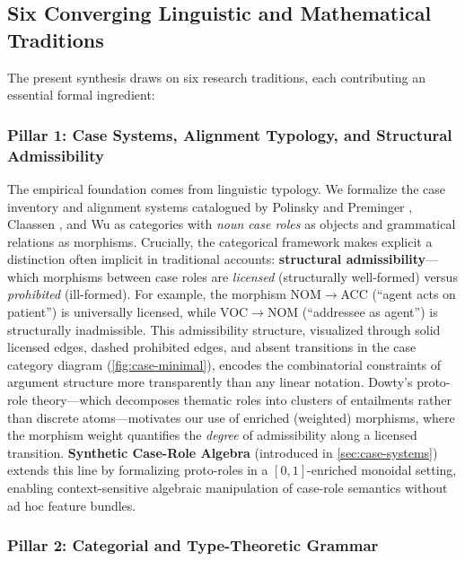 \documentclass[
]{article}
\begin{document}
\subsection{Six Converging Linguistic and Mathematical
Traditions}\label{six-converging-linguistic-and-mathematical-traditions}

The present synthesis draws on six research traditions, each
contributing an essential formal ingredient:

\subsubsection{Pillar 1: Case Systems, Alignment Typology, and
Structural
Admissibility}\label{pillar-1-case-systems-alignment-typology-and-structural-admissibility}

The empirical foundation comes from linguistic typology. We formalize
the case inventory and alignment systems catalogued by Polinsky and
Preminger \citeyearpar{polinsky2015case}, Claassen
\citeyearpar{claassen2019alignment}, and Wu \citeyearpar{wu2024amis} as
categories with \emph{noun case roles} as objects and grammatical
relations as morphisms. Crucially, the categorical framework makes
explicit a distinction often implicit in traditional accounts:
\textbf{structural admissibility}---which morphisms between case roles
are \emph{licensed} (structurally well-formed) versus \emph{prohibited}
(ill-formed). For example, the morphism NOM\texorpdfstring{\ensuremath{\to}}{->}ACC (``agent acts on
patient'') is universally licensed, while VOC\texorpdfstring{\ensuremath{\to}}{->}NOM (``addressee as
agent'') is structurally inadmissible. This admissibility structure,
visualized through solid licensed edges, dashed prohibited edges, and
absent transitions in the case category diagram
(\autoref{fig:case-minimal}), encodes the combinatorial constraints of
argument structure more transparently than any linear notation. Dowty's
\citeyearpar{dowty1991thematic} proto-role theory---which decomposes
thematic roles into clusters of entailments rather than discrete
atoms---motivates our use of enriched (weighted) morphisms, where the
morphism weight quantifies the \emph{degree} of admissibility along a
licensed transition. \textbf{Synthetic Case-Role Algebra} (introduced in
\autoref{sec:case-systems}) extends this line by formalizing proto-roles
in a \([0,1]\)-enriched monoidal setting, enabling context-sensitive
algebraic manipulation of case-role semantics without ad hoc feature
bundles.

\subsubsection{Pillar 2: Categorial and Type-Theoretic
Grammar}\label{pillar-2-categorial-and-type-theoretic-grammar}
\end{document}
